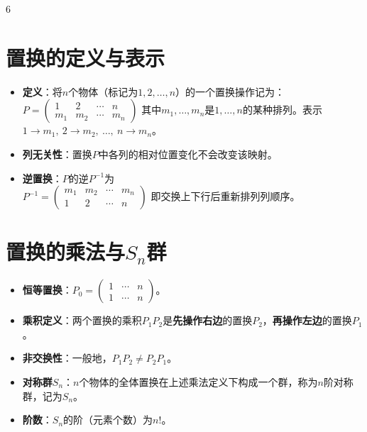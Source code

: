 \documentclass[landscape]{article}
\begin{document}
\begin{multicols*}{6}
\section*{置换的定义与表示}
\begin{itemize}
  \item \textbf{定义}：将$n$个物体（标记为$1,2,\dots,n$）的一个置换操作记为：
  \\
  $
  P=\begin{pmatrix} 1 & 2 & \cdots & n \\ m_1 & m_2 & \cdots & m_n \end{pmatrix}
  $
  其中$m_1,\dots,m_n$是$1,\dots,n$的某种排列。表示$1\to m_1,\ 2\to m_2,\ \dots,\ n\to m_n$。
  \item \textbf{列无关性}：置换$P$中各列的相对位置变化不会改变该映射。
  \item \textbf{逆置换}：$P$的逆$P^{-1}$为
  \\
  $
  P^{-1}=\begin{pmatrix} m_1 & m_2 & \cdots & m_n \\ 1 & 2 & \cdots & n \end{pmatrix}
  $
  即交换上下行后重新排列列顺序。
\end{itemize}

\section*{置换的乘法与$S_n$群}
\begin{itemize}
  \item \textbf{恒等置换}：$P_0=\begin{pmatrix} 1 & \cdots & n \\ 1 & \cdots & n \end{pmatrix}$。
  \item \textbf{乘积定义}：两个置换的乘积$P_1 P_2$是\textbf{先操作右边}的置换$P_2$，\textbf{再操作左边}的置换$P_1$。
  \item \textbf{非交换性}：一般地，$P_1 P_2 \neq P_2 P_1$。
  \item \textbf{对称群$S_n$}：$n$个物体的全体置换在上述乘法定义下构成一个群，称为$n$阶对称群，记为$S_n$。
  \item \textbf{阶数}：$S_n$的阶（元素个数）为$n!$。
\end{itemize}


\end{multicols*}
\end{document}
